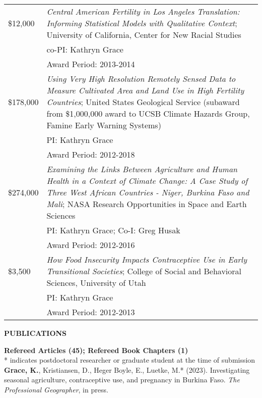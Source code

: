 \documentclass[11pt]{article} %
\begin{document}
\begin{tabular}{lp{11cm}}


\$12,000 & \emph{Central American Fertility in Los Angeles Translation: Informing Statistical Models with Qualitative Context}; University of California, Center for New Racial Studies\\
& co-PI: Kathryn Grace\\
&Award Period: 2013-2014\\



\$178,000 & \emph{Using Very High Resolution Remotely Sensed Data to Measure Cultivated Area and Land Use in High Fertility Countries}; United States Geological Service (subaward from \$1,000,000 award to UCSB Climate Hazards Group, Famine Early Warning Systems)\\
& PI: Kathryn Grace\\
& Award Period: 2012-2018\\




\$274,000 & \emph{Examining the Links Between Agriculture and Human Health in a Context of Climate Change: A Case Study of Three West African Countries - Niger, Burkina Faso and Mali}; NASA Research Opportunities in Space and Earth Sciences\\
 & PI: Kathryn Grace; Co-I: Greg Husak\\
 & Award Period: 2012-2016\\
 


\$3,500 &\emph{How Food Insecurity Impacts Contraceptive Use in Early Transitional Societies}; College of Social and Behavioral Sciences, University of Utah\\
& PI: Kathryn Grace\\
& Award Period: 2012-2013\\
\end{tabular}

\vspace{.5cm}
\noindent
{\large \textbf{PUBLICATIONS}}

\noindent
\textbf {Refereed Articles (45); Refereed Book Chapters (1)}\\
\noindent
* indicates postdoctoral researcher or graduate student at the time of submission\\

\noindent 
\textbf{Grace, K.}, Kristiansen, D., Heger Boyle, E., Luetke, M.* (2023). Investigating seasonal agriculture, contraceptive use, and pregnancy in Burkina Faso. \textit{The Professional Geographer}, in press.\\
\end{document}
